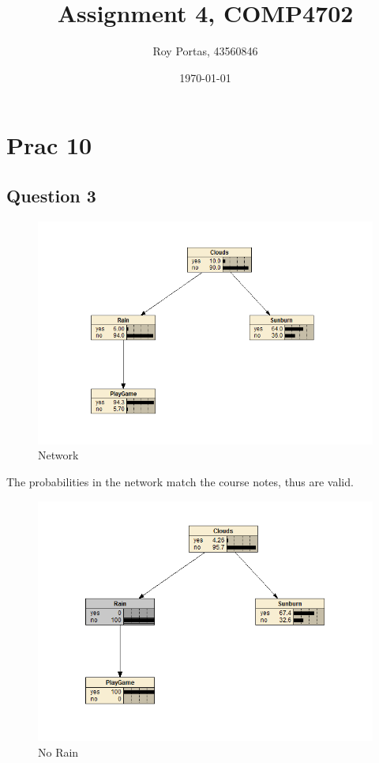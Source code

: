 
\usepackage{mathtools}
\usepackage{url}

\title{Assignment 4, COMP4702}
\author{Roy Portas, 43560846}
\date{\today}

 
\begin{titlepage}
    \maketitle
\end{titlepage}

\section*{Prac 10}

\subsection*{Question 3}

\begin{figure}[H]
    \includegraphics[width=\linewidth]{../../pracs/prac10/q3_network}
    \centering
    \caption{Network}
\end{figure}

The probabilities in the network match the course notes, thus are valid.

\begin{figure}[H]
    \includegraphics[width=\linewidth]{../../pracs/prac10/q3_no_rain}
    \centering
    \caption{No Rain}
\end{figure}

